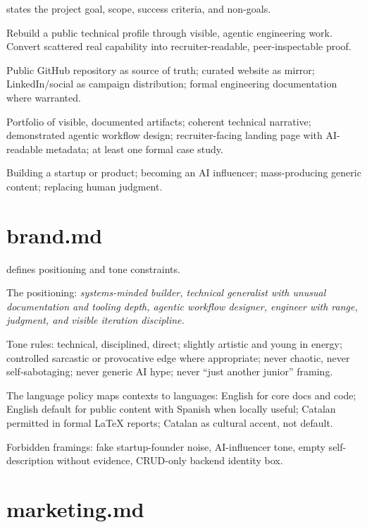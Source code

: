 \documentclass[a4paper,11pt,openany]{report}
\begin{document}
 states the project goal, scope, success
criteria, and non-goals.

\begin{description}[style=nextline]
  \item[Goal] Rebuild a public technical profile through visible, agentic
    engineering work. Convert scattered real capability into recruiter-readable,
    peer-inspectable proof.
  \item[Scope] Public GitHub repository as source of truth; curated website as
    mirror; LinkedIn/social as campaign distribution; formal engineering
    documentation where warranted.
  \item[Success criteria] Portfolio of visible, documented artifacts; coherent
    technical narrative; demonstrated agentic workflow design; recruiter-facing
    landing page with AI-readable metadata; at least one formal case study.
  \item[Non-goals] Building a startup or product; becoming an AI influencer;
    mass-producing generic content; replacing human judgment.
\end{description}

\section{brand.md}

 defines positioning and tone constraints.

The positioning: \emph{systems-minded builder, technical generalist with unusual
documentation and tooling depth, agentic workflow designer, engineer with range,
judgment, and visible iteration discipline.}

Tone rules: technical, disciplined, direct; slightly artistic and young in
energy; controlled sarcastic or provocative edge where appropriate; never
chaotic, never self-sabotaging; never generic AI hype; never ``just another
junior'' framing.

The language policy maps contexts to languages: English for core docs and code;
English default for public content with Spanish when locally useful; Catalan
permitted in formal LaTeX reports; Catalan as cultural accent, not default.

Forbidden framings: fake startup-founder noise, AI-influencer tone, empty
self-description without evidence, CRUD-only backend identity box.

\section{marketing.md}
\end{document}
